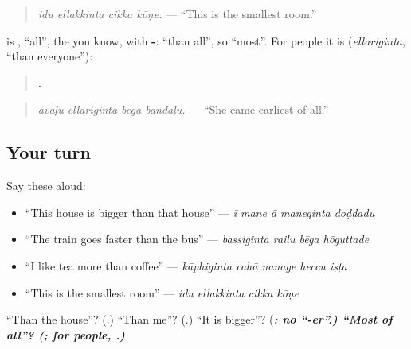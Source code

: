 \begin{quote}
\emph{idu ellakkinta cikka kōṇe.} — \textquotedblleft{}This is the smallest room.\textquotedblright{}
\end{quote}

\textbf{} is \textbf{}, \textquotedblleft{}all\textquotedblright{}, the \textbf{} you know, with \textbf{-}: \textquotedblleft{}than all\textquotedblright{}, so \textquotedblleft{}most\textquotedblright{}. For people it is \textbf{} (\emph{ellariginta}, \textquotedblleft{}than everyone\textquotedblright{}):

\begin{quote}
\textbf{   .}
\end{quote}

\begin{quote}
\emph{avaḷu ellariginta bēga bandaḷu.} — \textquotedblleft{}She came earliest of all.\textquotedblright{}
\end{quote}

\subsection*{Your turn}
Say these aloud:

\begin{itemize}
\raggedright
  \item \textquotedblleft{}This house is bigger than that house\textquotedblright{} — \emph{ī mane ā maneginta doḍḍadu}
  \item \textquotedblleft{}The train goes faster than the bus\textquotedblright{} — \emph{bassiginta railu bēga hōguttade}
  \item \textquotedblleft{}I like tea more than coffee\textquotedblright{} — \emph{kāphiginta cahā nanage heccu iṣṭa}
  \item \textquotedblleft{}This is the smallest room\textquotedblright{} — \emph{idu ellakkinta cikka kōṇe}
\end{itemize}

\begin{tcolorbox}[breakable,colback=teal!4,colframe=teal!35!black,title={Before you move on}]
\textquotedblleft{}Than the house\textquotedblright{}? (\textbf{}.) \textquotedblleft{}Than me\textquotedblright{}? (\textbf{}.) \textquotedblleft{}It is bigger\textquotedblright{}? (\textbf{\emph{}\emph{\textbf{\emph{: no \textquotedblleft{}-er\textquotedblright{}.) \textquotedblleft{}Most of all\textquotedblright{}? (\textbf{}; for people, \textbf{}.)}}}}
\end{tcolorbox}
